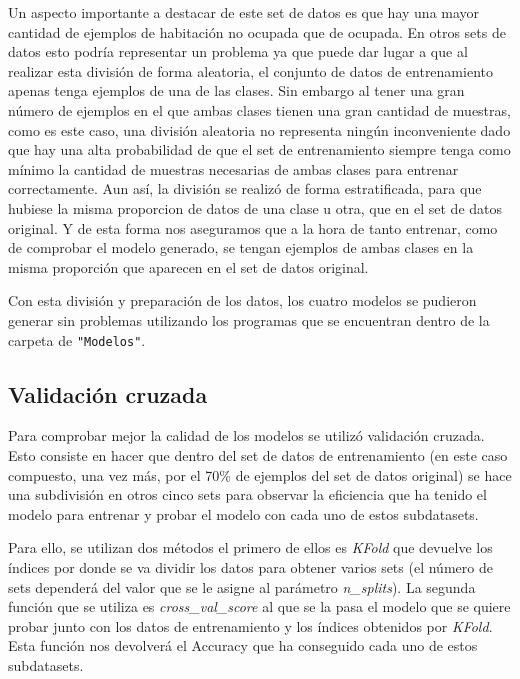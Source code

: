 \documentclass[a4paper, 12pt]{book}
\begin{document}
Un aspecto importante a destacar de este set de datos es que hay una mayor cantidad de ejemplos de habitación no ocupada que de ocupada. En otros sets de datos esto podría representar un problema ya que puede dar lugar a que al realizar esta división de forma aleatoria, el conjunto de datos de entrenamiento apenas tenga ejemplos de una de las clases. Sin embargo al tener una gran número de ejemplos en el que ambas clases tienen una gran cantidad de muestras, como es este caso, una división aleatoria no representa ningún inconveniente dado que hay una alta probabilidad de que el set de entrenamiento siempre tenga como mínimo la cantidad de muestras necesarias de ambas clases para entrenar correctamente. Aun así, la división se realizó de forma estratificada, para que hubiese la misma proporcion de datos de una clase u otra, que en el set de datos original. Y de esta forma nos aseguramos que a la hora de tanto entrenar, como de comprobar el modelo generado, se tengan ejemplos de ambas clases en la misma proporción que aparecen en el set de datos original.

Con esta división y preparación de los datos, los cuatro modelos se pudieron generar sin problemas utilizando los programas que se encuentran dentro de la carpeta de \texttt{"Modelos"}.  



\subsection{Validación cruzada}

Para comprobar mejor la calidad de los modelos se utilizó validación cruzada. Esto consiste en hacer que dentro del set de datos de entrenamiento (en este caso compuesto, una vez más, por el 70\% de ejemplos del set de datos original) se hace una subdivisión en otros cinco sets para observar la eficiencia que ha tenido el modelo para entrenar y probar el modelo con cada uno de estos subdatasets. 

Para ello, se utilizan dos métodos el primero de ellos es \textit{KFold} que devuelve los índices por donde se va dividir los datos para obtener varios sets (el número de sets dependerá del valor que se le asigne al parámetro \textit{n\_splits}). La segunda función que se utiliza es \textit{cross\_val\_score} al que se la pasa el modelo que se quiere probar junto con los datos de entrenamiento y los índices obtenidos por \textit{KFold}. Esta función nos devolverá el Accuracy que ha conseguido cada uno de estos subdatasets.
\end{document}
